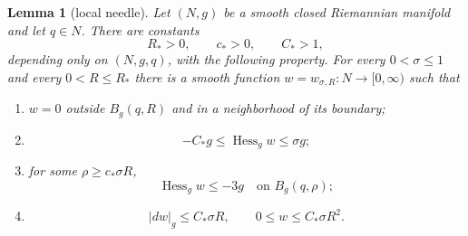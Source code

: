 \documentclass[10pt,a4paper]{amsart}
\newtheorem{lemma}{Lemma}
\newcommand{\Hess}{\operatorname{Hess}}
\begin{document}
\begin{lemma}[local needle]\label{lem:needle}
Let $(N,g)$ be a smooth closed Riemannian manifold and let $q\in N$.  There are constants
\[
 R_*>0,\qquad c_*>0,\qquad C_*>1,
\]
depending only on $(N,g,q)$, with the following property.  For every
$0<\sigma\le1$ and every $0<R\le R_*$ there is a smooth function
$w=w_{\sigma,R}:N\to[0,\infty)$ such that
\begin{enumerate}[label=\textup{(\roman*)}]
 \item $w=0$ outside $B_g(q,R)$ and in a neighborhood of its boundary;
 \item
 \[
  -C_*g\le\Hess_g w\le\sigma g;
 \]
 \item for some $\rho\ge c_*\sigma R$,
 \[
  \Hess_g w\le-3g
  \quad\text{on }B_g(q,\rho);
 \]
 \item
 \[
  |dw|_g\le C_*\sigma R,
  \qquad
  0\le w\le C_*\sigma R^2.
 \]
\end{enumerate}
\end{lemma}
\end{document}
